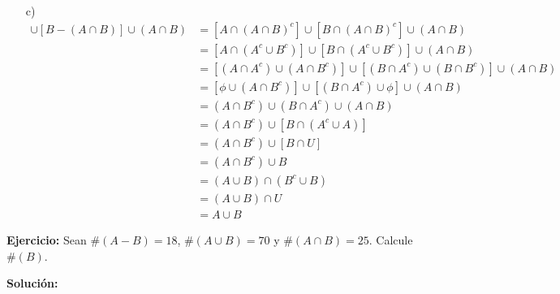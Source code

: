 \documentclass[a4paper,10pt]{article}
\begin{document}
\begin{enumerate}
            \item[c)]
                \begin{align*}
                          [A-(A \cap B)] \cup [B-(A \cap B)] \cup (A \cap B) &= [A\cap(A \cap B)^c] \cup [B\cap(A \cap B)^c] \cup (A \cap B) \\
                                                                             &= [A\cap(A^c \cup B^c)] \cup [B\cap(A^c \cup B^c)] \cup (A \cap B) \\
                                                                             &= [ (A \cap A^c) \cup (A \cap B^c)] \cup [(B \cap A^c) \cup (B \cap B^c)] \cup (A \cap B) \\
                                                                             &= [ \phi \cup (A \cap B^c)] \cup [(B \cap A^c) \cup \phi] \cup (A \cap B) \\
                                                                             &= (A \cap B^c) \cup (B \cap A^c)  \cup (A \cap B) \\
                                                                             &= (A \cap B^c) \cup [  B \cap (A^c \cup A)] \\
                                                                             &= (A \cap B^c) \cup [  B \cap U] \\
                                                                             &= (A \cap B^c) \cup B \\
                                                                             &= (A \cup B) \cap (B^c \cup B) \\
                                                                             &= (A \cup B) \cap U \\
                                                                             &= A \cup B
                \end{align*}
        \end{enumerate}
        \vspace{5mm}







\textbf{Ejercicio:} Sean $\# (A-B)=18$, $\#(A\cup B)=70$ y $\#(A\cap B)=25$. Calcule $\#(B)$. \vspace{3mm}

\textbf{Solución:}
\end{document}
